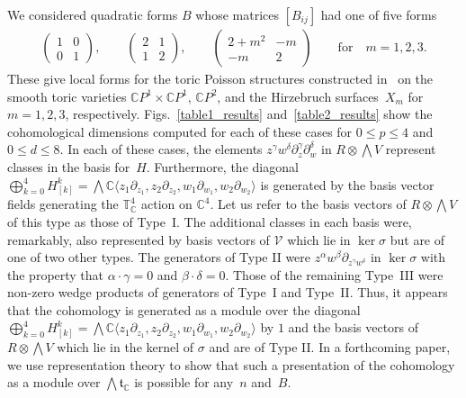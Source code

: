 \documentclass[10pt,a4paper]{amsart}
\numberwithin{equation}{section}
\begin{document}
We considered quadratic forms $B$ whose matrices $[B_{ij}]$ had one of f\/ive forms
\begin{gather*}
\begin{pmatrix}1 & 0 \\ 0 & 1\end{pmatrix},\qquad \begin{pmatrix}2 & 1 \\ 1 & 2\end{pmatrix},\qquad \begin{pmatrix}2+m^2 & -m \\ -m & 2\end{pmatrix}\qquad \text{for} \quad m=1,2,3.
\end{gather*}
These give local forms for the toric Poisson structures constructed in~\cite{Caine} on the smooth toric varieties ${\mathbb C} P^1\times {\mathbb C} P^1$, ${\mathbb C} P^2$, and the Hirzebruch surfaces~$X_m$ for $m=1,2,3$, respectively. Figs.~\ref{table1_results} and~\ref{table2_results} show the cohomological dimensions computed for each of these cases for $0\le p\le 4$ and $0\le d\le 8$. In each of these cases, the elements $z^\gamma w^\delta \partial_{z}^\gamma \partial_{w}^\delta$ in $R\otimes \bigwedge V$ represent classes in the basis for~$H$. Furthermore, the diagonal $\bigoplus_{k=0}^4 H_{[k]}^k=\bigwedge {\mathbb C}\langle z_1\partial_{z_1},z_2\partial_{z_2},w_1\partial_{w_1},w_2\partial_{w_2}\rangle$ is generated by the basis vector f\/ields generating the ${\mathbb T}_{\mathbb C}^{4}$ action on ${\mathbb C}^4$. Let us refer to the basis vectors of $R\otimes \bigwedge V$ of this type as those of Type~I. The additional classes in each basis were, remarkably, also represented by basis vectors of $\mathcal V$ which lie in $\ker\sigma$ but are of one of two other types. The generators of Type II were $z^\alpha w^\beta \partial_{z^\gamma w^\delta}$ in $\ker \sigma$ with the property that $\alpha\cdot\gamma=0$ and $\beta\cdot\delta=0$. Those of the remaining Type~III were non-zero wedge products of generators of Type~I and Type~II. Thus, it appears that the cohomology is generated as a module over the diagonal $\bigoplus_{k=0}^4 H_{[k]}^k=\bigwedge {\mathbb C}\langle z_1\partial_{z_1},z_2\partial_{z_2}, w_1\partial_{w_1}, w_2\partial_{w_2}\rangle$ by $1$ and the basis vectors of $R\otimes \bigwedge V$ which lie in the kernel of $\sigma$ and are of Type II. In a forthcoming paper, we use representation theory to show that such a presentation of the cohomology as a module over $\bigwedge {\mathfrak t}_{\mathbb C}$ is possible for any~$n$ and~$B$.
\end{document}
